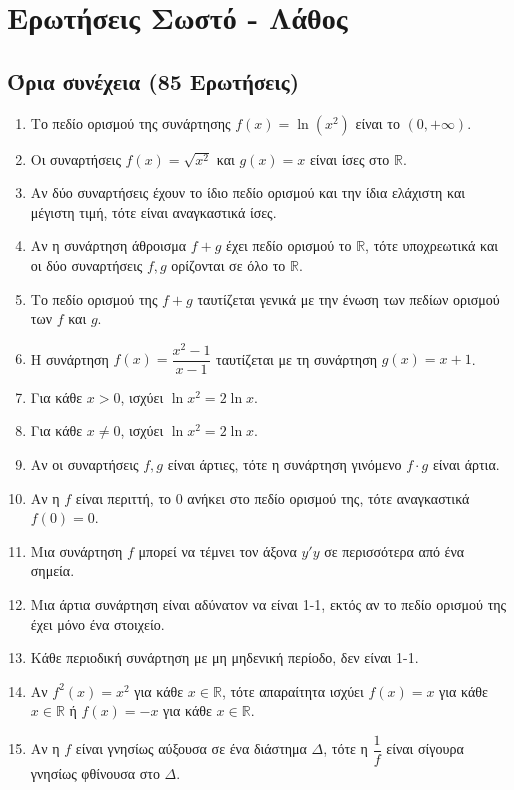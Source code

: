 \section{Ερωτήσεις Σωστό - Λάθος}
\subsection{Όρια συνέχεια (85 Ερωτήσεις)}
\begin{enumerate}[label=\textbf{1.\arabic*.}]
    \item Το πεδίο ορισμού της συνάρτησης $f(x) = \ln(x^2)$ είναι το $(0, +\infty)$.
    \item Οι συναρτήσεις $f(x) = \sqrt{x^2}$ και $g(x) = x$ είναι ίσες στο $\mathbb{R}$.
    \item Αν δύο συναρτήσεις έχουν το ίδιο πεδίο ορισμού και την ίδια ελάχιστη και μέγιστη τιμή, τότε είναι αναγκαστικά ίσες.
    \item Αν η συνάρτηση άθροισμα $f+g$ έχει πεδίο ορισμού το $\mathbb{R}$, τότε υποχρεωτικά και οι δύο συναρτήσεις $f, g$ ορίζονται σε όλο το $\mathbb{R}$.
    \item Το πεδίο ορισμού της $f+g$ ταυτίζεται γενικά με την ένωση των πεδίων ορισμού των $f$ και $g$.
    \item Η συνάρτηση $f(x) = \dfrac{x^2-1}{x-1}$ ταυτίζεται με τη συνάρτηση $g(x) = x+1$.
    \item Για κάθε $x>0$, ισχύει $\ln x^2 = 2\ln x$.
    \item Για κάθε $x \neq 0$, ισχύει $\ln x^2 = 2\ln x$.
    \item Αν οι συναρτήσεις $f, g$ είναι άρτιες, τότε η συνάρτηση γινόμενο $f \cdot g$ είναι άρτια.
    \item Αν η $f$ είναι περιττή, το $0$ ανήκει στο πεδίο ορισμού της, τότε αναγκαστικά $f(0)=0$.
    \item Μια συνάρτηση $f$ μπορεί να τέμνει τον άξονα $y'y$ σε περισσότερα από ένα σημεία.
    \item Μια άρτια συνάρτηση είναι αδύνατον να είναι 1-1, εκτός αν το πεδίο ορισμού της έχει μόνο ένα στοιχείο.
    \item Κάθε περιοδική συνάρτηση με μη μηδενική περίοδο, δεν είναι 1-1.
    \item Αν $f^2(x) = x^2$ για κάθε $x \in \mathbb{R}$, τότε απαραίτητα ισχύει $f(x)=x$ για κάθε $x \in \mathbb{R}$ ή $f(x)=-x$ για κάθε $x \in \mathbb{R}$.
    \item Αν η $f$ είναι γνησίως αύξουσα σε ένα διάστημα $\Delta$, τότε η $\dfrac{1}{f}$ είναι σίγουρα γνησίως φθίνουσα στο $\Delta$.

\end{enumerate}
